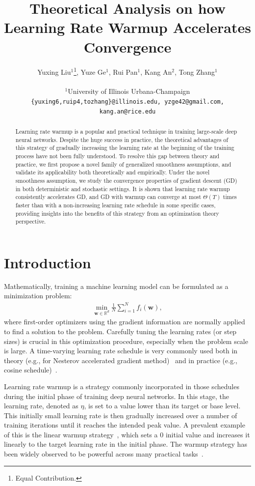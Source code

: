 \documentclass{article}
\title{\textbf{Theoretical Analysis on how Learning Rate Warmup Accelerates Convergence}}
\author{%
{Yuxing Liu$^{1}$\thanks{Equal Contribution.}, \quad
Yuze Ge$^{1}$\footnotemark[1], \quad
Rui Pan$^{1}$, \quad Kang An$^{2}$, \quad
Tong Zhang$^{1}$}
\\ \\
{
$^{1}$University of Illinois Urbana-Champaign}
\quad {$^{2}$Rice University } \\
\normalsize\texttt{\{yuxing6,ruip4,tozhang\}@illinois.edu, yzge42@gmail.com, kang.an@rice.edu}
}
\newcommand{\bw}{\mathbf{w}}
\newcommand{\RR}{\mathbb{R}}
\begin{document}
\maketitle


\begin{abstract}
    Learning rate warmup is a popular and practical technique in training large-scale deep neural networks. Despite the huge success in practice, the theoretical advantages of this strategy of gradually increasing the learning rate at the beginning of the training process have not been fully understood. To resolve this gap between theory and practice, we first propose a novel family of generalized smoothness assumptions, and validate its applicability both theoretically and empirically. 
    Under the novel smoothness assumption, we study the convergence properties of gradient descent (GD) in both deterministic and stochastic settings. It is shown that learning rate warmup consistently accelerates GD, and GD with warmup can converge at most $\Theta(T)$ times faster than with a non-increasing learning rate schedule in some specific cases, providing insights into the benefits of this strategy from an optimization theory perspective.
\end{abstract}


\section{Introduction}
Mathematically, training a machine learning model can be formulated as a minimization problem:
\begin{align*}
    \min_{\bw \in \RR^d} \frac{1}{N} \sum_{i=1}^N f_i(\bw) ,
\end{align*}
where first-order optimizers using the gradient information are normally applied to find a solution to the problem. 
Carefully tuning the learning rates (or step sizes) is crucial in this optimization procedure, especially when the problem scale is large. 
A time-varying learning rate schedule is very commonly used both in theory (e.g., for Nesterov accelerated gradient method)~\citep{malitsky2020adaptive,teboulle2023elementary, boyd2004convex} and in practice (e.g., cosine schedule)~\citep{ he2016deep, vaswani2017attention,loshchilov2017sgdr,touvron2023llama}. 

Learning rate warmup is a strategy commonly incorporated in those schedules during the initial phase of training deep neural networks. In this stage, the learning rate, denoted as $\eta$, is set to a value lower than its target or base level. This initially small learning rate is then gradually increased over a number of training iterations until it reaches the intended peak value. A prevalent example of this is the linear warmup strategy~\citep{goyal2017accurate}, which sets a $0$ initial value and increases it linearly to the target learning rate in the initial phase. The warmup strategy has been widely observed to be powerful across many practical tasks~\citep{he2016deep, goyal2017accurate, vaswani2017attention}.
\end{document}
